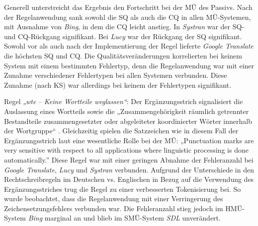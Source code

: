 Generell unterstreicht das Ergebnis den Fortschritt bei der MÜ des Passivs. Nach der Regelanwendung sank sowohl die SQ als auch die CQ in allen MÜ-Systemen, mit Ausnahme von \textit{Bing}, in dem die CQ leicht anstieg. In \textit{Systran} war der SQ- und CQ-Rückgang signifikant. Bei \textit{Lucy} war der Rückgang der SQ signifikant. Sowohl vor als auch nach der Implementierung der Regel lieferte \textit{Google Translate} die höchsten SQ und CQ. Die Qualitätsveränderungen korrelierten bei keinem System mit einem bestimmten Fehlertyp, denn die Regelanwendung war mit einer Zunahme verschiedener Fehlertypen bei allen Systemen verbunden. Diese Zunahme (nach KS) war allerdings bei keinem der Fehlertypen signifikant.

Regel \textit{„wte} -- \textit{Keine Wortteile weglassen“}: Der Ergänzungsstrich signalisiert die Auslassung eines Wortteils sowie die „Zusammengehörigkeit räumlich getrennter Bestandteile zusammengesetzter oder abgeleiteter koordinierter Wörter innerhalb der Wortgruppe“ \citep[191]{Nerius2007}. Gleichzeitig spielen die Satzzeichen wie in diesem Fall der Ergänzungsstrich laut \citet[2]{Reuther2003} eine wesentliche Rolle bei der MÜ: „Punctuation marks are very sensitive with respect to all applications where linguistic processing is done automatically.” Diese Regel war mit einer geringen Abnahme der Fehleranzahl bei \textit{Google Translate}, \textit{Lucy} und \textit{Systran} verbunden. Aufgrund der Unterschiede in den Rechtschreibregeln im Deutschen vs. Englischen in Bezug auf die Verwendung des Ergänzungsstriches trug die Regel zu einer verbesserten Tokenisierung bei. So wurde beobachtet, dass die Regelanwendung mit einer Verringerung des Zeichensetzungsfehlers verbunden war. Die Fehleranzahl stieg jedoch im HMÜ-System \textit{Bing} marginal an und blieb im SMÜ-System \textit{SDL} unverändert.

